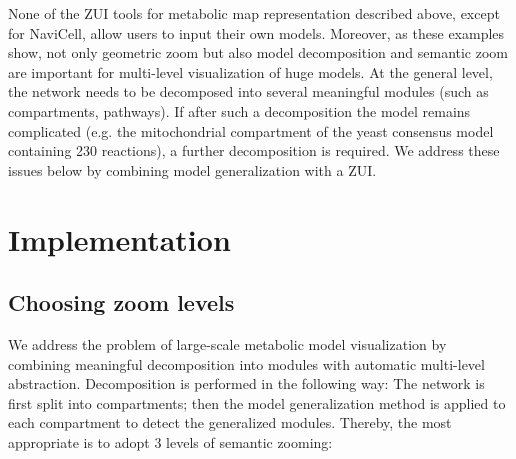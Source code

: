 \documentclass{bmcart}
\begin{document}
None of the ZUI tools for metabolic map representation described above, except for NaviCell, allow users to input their own models. Moreover, as these examples show, not only geometric zoom but also model decomposition and semantic zoom are important for multi-level visualization of huge models. At the general level, the network needs to be decomposed into several meaningful modules (such as compartments, pathways). If after such a decomposition the model remains complicated (e.g. the mitochondrial compartment of the yeast consensus model~\cite{Herrgard2008} containing 230 reactions), a further decomposition is required. We address these issues below by combining model generalization with a ZUI.


\section*{Implementation}

\subsection*{Choosing zoom levels}
We address the problem of large-scale metabolic model visualization by combining meaningful decomposition into modules with automatic multi-level abstraction. Decomposition is performed in the following way: The network is first split into compartments; then the model generalization method is applied to each compartment to detect the generalized modules. Thereby, the most appropriate is to adopt 3 levels of semantic zooming:
\end{document}
